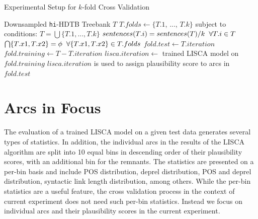 \begin{algorithm}[H]
\caption{Experimental Setup for $k$-fold Cross Validation}
\label{algo:liscadata}
    \begin{algorithmic}[1]
    \REQUIRE Downsampled \texttt{hi}-HDTB Treebank $T$
        \STATE $T.folds \leftarrow \{T.1$, ..., $T.k\}$ subject to conditions:
        \STATE \hspace{5mm} $T = \bigcup \{T.1, ..., T.k\}$ 
        \STATE \hspace{5mm} $sentences(T.i) = sentences(T)/k \hspace{2mm} \forall T.i \in T$
        \STATE \hspace{5mm} $\bigcap \{T.x1, T.x2\} = \phi \hspace{2mm} \forall \{T.x1, T.x2\}  \in T.folds$ 
            \STATE $fold.test \leftarrow T.iteration$
            \STATE $fold.training \leftarrow T - T.iteration$
            \STATE $lisca.iteration \leftarrow$ trained LISCA model on $fold.training$
            \STATE $lisca.iteration$ is used to assign plausibility score to arcs in $fold.test$
        \ENDFOR
    \ENDFOR
    \end{algorithmic}
\end{algorithm}

\section{Arcs in Focus}
\label{arcs:focus}

The evaluation of a trained LISCA model on a given test data generates several types of statistics. In addition, the individual arcs in the results of the LISCA algorithm are split into 10 equal bins in descending order of their plausibility scores, with an additional bin for the remnants. The statistics are presented on a per-bin basis and include POS distribution, deprel distribution, POS and deprel distribution, syntactic link length distribution, among others. While the per-bin statistics are a useful feature, the cross validation process in the context of current experiment does not need such per-bin statistics. Instead we focus on individual arcs and their plausibility scores in the current experiment.

